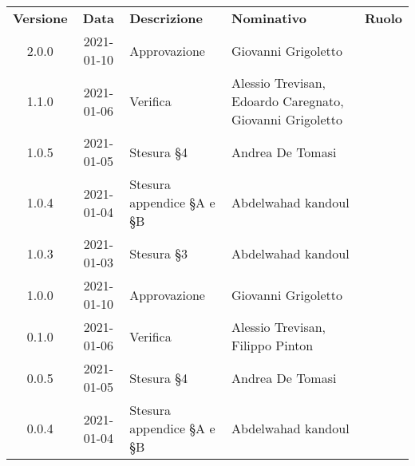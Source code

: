 {
    \renewcommand{\arraystretch}{1.5}
    \centering
    \begin{longtable}{ c c  C{3.5cm}  C{4cm}  c }
        \rowcolor{\primaryColor}
        \textcolor{\secondaryColor}{
        \textbf{Versione}}     & \textcolor{\secondaryColor}{\textbf{Data}}       & \textcolor{\secondaryColor}
        {\textbf{Descrizione}} & \textcolor{\secondaryColor}{\textbf{Nominativo}} & \textcolor{\secondaryColor}{\textbf{Ruolo}}                          \\


        2.0.0                   &2021-01-10                                        & Approvazione                                   &Giovanni Grigoletto & \responsabile{}\\
        1.1.0                  &2021-01-06                                       & Verifica                            & Alessio Trevisan, Edoardo Caregnato, Giovanni Grigoletto &\verificatore{}\\
        1.0.5                   &2021-01-05                                        & Stesura §4                              & Andrea De Tomasi & \verificatore{} \\
        1.0.4                  & 2021-01-04                                       & Stesura appendice §A e §B                          & Abdelwahad kandoul & \verificatore{} \\
        1.0.3                  & 2021-01-03                                       & Stesura §3                            & Abdelwahad kandoul & \verificatore{} \\
        1.0.0                   &2021-01-10                                        & Approvazione                                   &Giovanni Grigoletto & \responsabile{}\\
        0.1.0                  &2021-01-06                                       & Verifica                            & Alessio Trevisan, Filippo Pinton &\verificatore{}\\
        0.0.5                   &2021-01-05                                        & Stesura §4                              & Andrea De Tomasi & \verificatore{} \\
        0.0.4                  & 2021-01-04                                       & Stesura appendice §A e §B                          & Abdelwahad kandoul & \verificatore{} \\

\end{longtable}}
